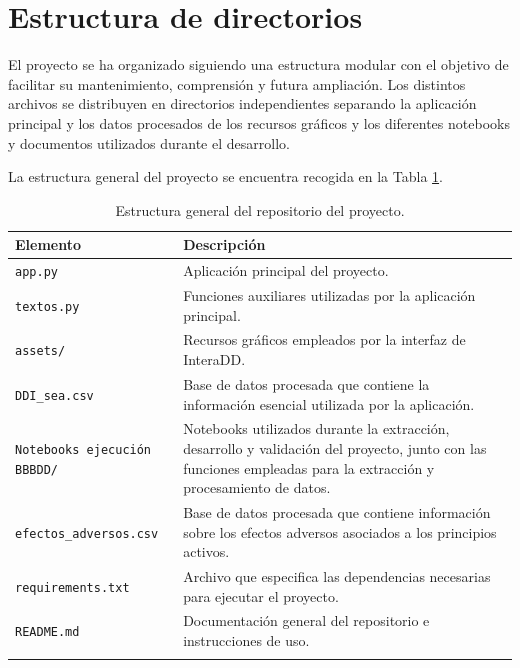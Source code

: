 
\section{Estructura de directorios}

El proyecto se ha organizado siguiendo una estructura modular con el objetivo de facilitar su mantenimiento, 
comprensión y futura ampliación. Los distintos archivos se distribuyen en directorios independientes separando la 
aplicación principal y los datos procesados de los recursos gráficos y los diferentes 
notebooks y documentos utilizados durante el desarrollo.

La estructura general del proyecto se encuentra recogida en la Tabla \ref{tab:estructura}.

\begin{table}[h]
\centering
\caption{Estructura general del repositorio del proyecto.}
\label{tab:estructura_proyecto}
\begin{tabular}{p{5cm} p{9cm}}
\toprule
\textbf{Elemento} & \textbf{Descripción} \\
\midrule
\texttt{app.py} & Aplicación principal del proyecto. \\

\texttt{textos.py} & Funciones auxiliares utilizadas por la aplicación principal. \\

\texttt{assets/} & Recursos gráficos empleados por la interfaz de InteraDD. \\

\texttt{DDI\_sea.csv} & Base de datos procesada que contiene la información esencial utilizada por la aplicación. \\

\texttt{Notebooks ejecución BBBDD/} & Notebooks utilizados durante la extracción, desarrollo y validación del proyecto, junto con las funciones empleadas para la extracción y procesamiento de datos. \\

\texttt{efectos\_adversos.csv} & Base de datos procesada que contiene información sobre los efectos adversos asociados a los principios activos. \\

\texttt{requirements.txt} & Archivo que especifica las dependencias necesarias para ejecutar el proyecto. \\

\texttt{README.md} & Documentación general del repositorio e instrucciones de uso. \\
\bottomrule
\label{tab:estructura}
\end{tabular}
\end{table}

